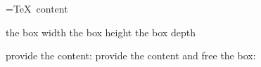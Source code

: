\documentclass{article}
\begin{document}
\vspace*{\fill}\vspace{-5ex}
\obeylines

\newbox\mybox
\setbox\mybox=\hbox{TeX content}

the box width \the\wd\mybox 
the box height \the\ht\mybox  
the box depth \the\dp\mybox 

provide the content: \copy\mybox 
provide the content and free the box: \box\mybox



\vspace*{\fill}
\end{document}
